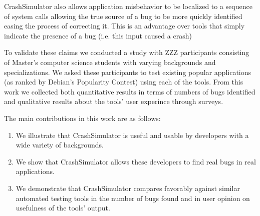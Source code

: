 CrashSimulator also allows application misbehavior to be localized to a
sequence of system calls allowing the true source of a bug to be more
quickly identified easing the process of correcting it.  This is an
advantage over tools that simply indicate the presence of a bug (i.e.  this
input caused a crash)

To validate these claims we conducted a study with ZZZ participants
consisting of Master's computer science students with varying backgrounds
and specializations.  We asked these participants to test existing popular
applications (as ranked by Debian's Popularity Contest) using each of the
tools.  From this work we collected both quantitative results in terms of
numbers of bugs identified and qualitative results about the tools' user
experince through surveys.

The main contributions in this work are as follows:
\begin{enumerate}

\item We illustrate that CrashSimulator is useful and usable by developers
with a wide variety of backgrounds.

\item We show that CrashSimulator allows these developers to find real bugs
in real applications.

\item We demonstrate that CrashSimulator compares favorably against similar
automated testing tools in the number of bugs found and in user opinion on
usefulness of the tools' output.

\end{enumerate}
